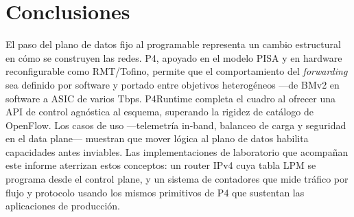 \documentclass[conference,onecolumn,10pt]{IEEEtran}
\begin{document}
\section{Conclusiones}
El paso del plano de datos fijo al programable representa un cambio estructural en
cómo se construyen las redes. P4, apoyado en el modelo PISA y en hardware
reconfigurable como RMT/Tofino, permite que el comportamiento del \emph{forwarding}
sea definido por software y portado entre objetivos heterogéneos —de BMv2 en
software a ASIC de varios Tbps. P4Runtime completa el cuadro al ofrecer una API de
control agnóstica al esquema, superando la rigidez de catálogo de OpenFlow. Los
casos de uso —telemetría in-band, balanceo de carga y seguridad en el data
plane— muestran que mover lógica al plano de datos habilita capacidades antes
inviables. Las implementaciones de laboratorio que acompañan este informe
aterrizan estos conceptos: un router IPv4 cuya tabla LPM se programa desde el
control plane, y un sistema de contadores que mide tráfico por flujo y protocolo
usando los mismos primitivos de P4 que sustentan las aplicaciones de producción.
\end{document}
